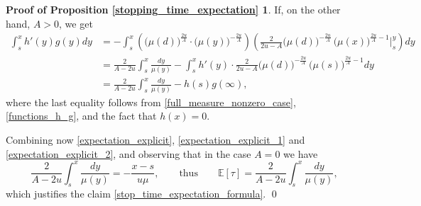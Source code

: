 \documentclass[11pt,tbtags,reqno]{article}
\theoremstyle{definition}
\numberwithin{equation}{section}
\theoremstyle{definition}
\newtheorem*{proof_prop_2}{Proof of Proposition \ref{stopping_time_expectation}}
\newcommand{\ex}{\mathbb{E}}
\begin{document}
\begin{appendices}
\begin{proof_prop_2}
If, on the other hand, $A > 0$, we get 
\begin{equation}\label{expectation_explicit_2}
    \begin{split}
        \int_s^x h'(y)g(y)dy 
        &= 
        -\int_s^x \left(\big(\mu(d)\big)^{\frac{2u}{A}} \cdot \big(\mu(y)\big)^{-\frac{2u}{A}}\right) \left(\frac{2}{2u - A} \big(\mu(d)\big)^{-\frac{2u}{A}} \, \big(\mu(x)\big) ^{\frac{2u}{A} - 1} \bigg|_s^y \right) dy
        \\&= 
        \frac{2}{A-2u} \int_s^x \frac{dy}{\mu(y)} - \int_s^x h'(y) \cdot \frac{2}{2u - A} \big(\mu(d)\big)^{-\frac{2u}{A}} \, \big(\mu(s)\big) ^{\frac{2u}{A} - 1} dy 
        \\&=
        \frac{2}{A-2u} \int_s^x \frac{dy}{\mu(y)} - h(s)g(\infty),
    \end{split}
\end{equation}
where the last equality follows from \eqref{full_measure_nonzero_case}, \eqref{functions_h_g}, and the fact that $h(x) = 0$.

Combining now \eqref{expectation_explicit}, \eqref{expectation_explicit_1} and \eqref{expectation_explicit_2}, and observing that in the case $A = 0$ we have 
\begin{equation}
    \frac{2}{A - 2u}\int_s^x \frac{dy}{\mu(y)} = -\frac{x-s}{u\mu}, \quad \quad \text{thus} \quad \quad
    \ex[\tau] = \frac{2}{A - 2u}\int_s^x \frac{dy}{\mu(y)},
\end{equation}
which justifies the claim \eqref{stop_time_expectation_formula}. \qed
\end{proof_prop_2}

\end{appendices}

\printbibliography
\end{document}
